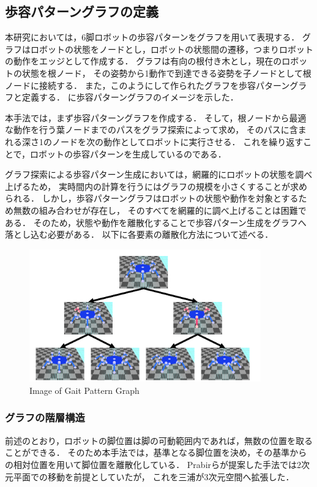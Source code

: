 \subsection{歩容パターングラフの定義}
本研究においては，6脚ロボットの歩容パターンをグラフを用いて表現する．
グラフはロボットの状態をノードとし，ロボットの状態間の遷移，つまりロボットの動作をエッジとして作成する．
グラフは有向の根付き木とし，現在のロボットの状態を根ノード，
その姿勢から1動作で到達できる姿勢を子ノードとして根ノードに接続する．
また，このようにして作られたグラフを歩容パターングラフと定義する．
に歩容パターングラフのイメージを示した．

本手法では，まず歩容パターングラフを作成する．
そして，根ノードから最適な動作を行う葉ノードまでのパスをグラフ探索によって求め，
そのパスに含まれる深さ1のノードを次の動作としてロボットに実行させる．
これを繰り返すことで，ロボットの歩容パターンを生成しているのである．

グラフ探索による歩容パターン生成においては，網羅的にロボットの状態を調べ上げるため，
実時間内の計算を行うにはグラフの規模を小さくすることが求められる．
しかし，歩容パターングラフはロボットの状態や動作を対象とするため無数の組み合わせが存在し，
そのすべてを網羅的に調べ上げることは困難である．
そのため，状態や動作を離散化することで歩容パターン生成をグラフへ落とし込む必要がある．
以下に各要素の離散化方法について述べる．
\\  %

\begin{figure}[h]
  \begin{center}
    \includegraphics[width=100mm, clip]{figure/chapter2/gait_pattern_graph.png}
    \caption{Image of Gait Pattern Graph}
    \label{fig:image_of_gait_pattern_graph} %
  \end{center}
\end{figure}

\subsubsection{グラフの階層構造}
前述のとおり，ロボットの脚位置は脚の可動範囲内であれば，無数の位置を取ることができる．
そのため本手法では，基準となる脚位置を決め，その基準からの相対位置を用いて脚位置を離散化している．
Prabirらが提案した手法では2次元平面での移動を前提としていたが\cite{Prabir_Graph_search}，
これを三浦が3次元空間へ拡張した\cite{Miura_Graph_search}．

